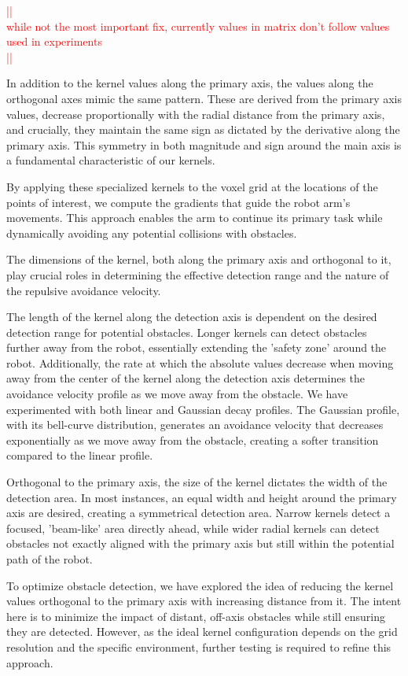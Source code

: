 \documentclass[a4paper]{article}
\newcommand\todocomment[1]{\textcolor{red}{||\\ #1\\||}}
\begin{document}
\todocomment{while not the most important fix, currently values in matrix don't follow values used in experiments}


In addition to the kernel values along the primary axis, the values along the orthogonal axes mimic the same pattern. These are derived from the primary axis values, decrease proportionally with the radial distance from the primary axis, and crucially, they maintain the same sign as dictated by the derivative along the primary axis. This symmetry in both magnitude and sign around the main axis is a fundamental characteristic of our kernels.

By applying these specialized kernels to the voxel grid at the locations of the points of interest, we compute the gradients that guide the robot arm's movements. This approach enables the arm to continue its primary task while dynamically avoiding any potential collisions with obstacles.

The dimensions of the kernel, both along the primary axis and orthogonal to it, play crucial roles in determining the effective detection range and the nature of the repulsive avoidance velocity.

The length of the kernel along the detection axis is dependent on the desired detection range for potential obstacles. Longer kernels can detect obstacles further away from the robot, essentially extending the 'safety zone' around the robot. Additionally, the rate at which the absolute values decrease when moving away from the center of the kernel along the detection axis determines the avoidance velocity profile as we move away from the obstacle. We have experimented with both linear and Gaussian decay profiles. The Gaussian profile, with its bell-curve distribution, generates an avoidance velocity that decreases exponentially as we move away from the obstacle, creating a softer transition compared to the linear profile.

Orthogonal to the primary axis, the size of the kernel dictates the width of the detection area. In most instances, an equal width and height around the primary axis are desired, creating a symmetrical detection area. Narrow kernels detect a focused, 'beam-like' area directly ahead, while wider radial kernels can detect obstacles not exactly aligned with the primary axis but still within the potential path of the robot.

To optimize obstacle detection, we have explored the idea of reducing the kernel values orthogonal to the primary axis with increasing distance from it. The intent here is to minimize the impact of distant, off-axis obstacles while still ensuring they are detected. However, as the ideal kernel configuration depends on the grid resolution and the specific environment, further testing is required to refine this approach.
		 
\end{document}
